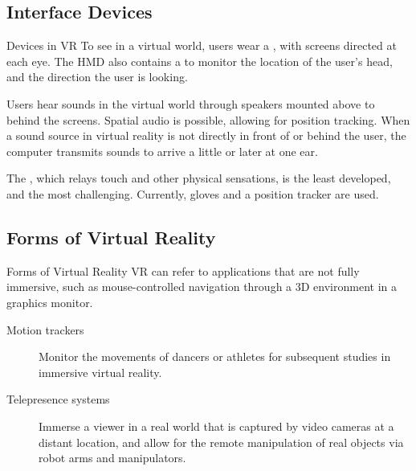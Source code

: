 \documentclass[\main/notes.tex]{subfiles}
\begin{document}
			\subsection{Interface Devices}
				\begin{sidenote}{Devices in VR}
					To see in a virtual world, users wear a , with screens directed at each eye. The HMD also contains a  to monitor the location of the user's head, and the direction the user is looking.

					Users hear sounds in the virtual world through speakers mounted above to behind the screens. Spatial audio is possible, allowing for position tracking. When a sound source in virtual reality is not directly in front of or behind the user, the computer transmits sounds to arrive a little or later at one ear.

					The , which relays touch and other physical sensations, is the least developed, and the most challenging. Currently, gloves and a position tracker are used.
				\end{sidenote}
			\subsection{Forms of Virtual Reality}
				\begin{sidenote}{Forms of Virtual Reality}
					VR can refer to applications that are not fully immersive, such as mouse-controlled navigation through a 3D environment in a graphics monitor.
					\begin{description}
						\item[Motion trackers] Monitor the movements of dancers or athletes for subsequent studies in immersive virtual reality.
						\item[Telepresence systems] Immerse a viewer in a real world that is captured by video cameras at a distant location, and allow for the remote manipulation of real objects via robot arms and manipulators.
					\end{description}
				\end{sidenote}
\end{document}
